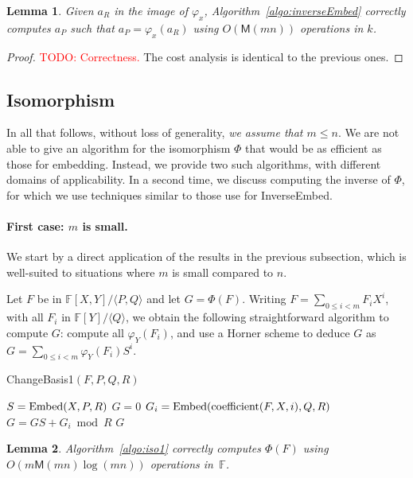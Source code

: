 \documentclass[12pt]{article}
\def\M {\ensuremath{\mathsf{M}}}
\def\F {\ensuremath{\mathbb{F}}}
\def\coeff {\ensuremath{\mathrm{coefficient}}}
\newcommand{\todo}[1]{\textcolor{red}{TODO: #1}}
\newtheorem{Lemma}{Lemma}
\begin{document}
\begin{Lemma}
  Given $a_R$ in the image of $\varphi_x$,
  Algorithm~\ref{algo:inverseEmbed} correctly computes $a_P$ such that
  $a_P=\varphi_x(a_R)$ using $O(\M(mn))$ operations in $k$.
\end{Lemma}
\begin{proof}
  \todo{Correctness.} The cost analysis is identical to the previous
  ones.
\end{proof}



\subsection{Isomorphism} 

In all that follows, without loss of generality, {\em we assume that
  $m\le n$}. We are not able to give an algorithm for the isomorphism
$\Phi$ that would be as efficient as those for embedding. Instead, we
provide two such algorithms, with different domains of applicability.
In a second time, we discuss computing the inverse of $\Phi$,
for which we use techniques similar to those use for InverseEmbed.

\paragraph{First case: $m$ is small.}
We start by a direct application of the results in the previous
subsection, which is well-suited to situations where $m$ is small compared to $n$. 

Let $F$ be in $\F[X,Y]/\langle P,Q\rangle$ and let
$G=\Phi(F)$. Writing $F=\sum_{0 \le i < m} F_i X^i$, with all $F_i$ in
$\F[Y]/\langle Q \rangle$, we obtain the following straightforward
algorithm to compute $G$: compute all $\varphi_Y(F_i)$, and use a
Horner scheme to deduce $G$ as $G=\sum_{0 \le i < m} \varphi_Y(F_i) S^i$.
\begin{algorithm}[H]
  \caption{ChangeBasis1$(F,P,Q,R)$}
  \begin{algorithmic}[1]
    \STATE $S={\rm Embed}(X,P,R)$
    \STATE $G=0$
    \STATE $G_i = {\rm Embed}(\coeff(F,X,i),Q,R)$
    \STATE $G = GS+G_i \bmod R$
    \ENDFOR
    \RETURN $G$
  \end{algorithmic}
  \label{algo:iso1}
\end{algorithm}

\begin{Lemma}
  Algorithm~\ref{algo:iso1} correctly computes $\Phi(F)$ using
  $O(m\M(mn)\log(mn))$ operations in~$\F$.
\end{Lemma}
\end{document}
